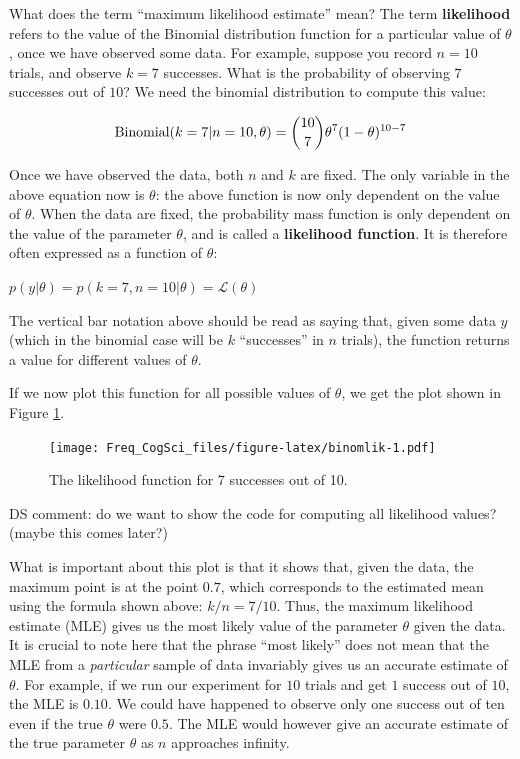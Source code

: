 \documentclass[12pt,]{krantz}
\makeatletter
\newenvironment{kframe}{%
\medskip{}
\setlength{\fboxsep}{.8em}
 \def\at@end@of@kframe{}%
 \ifinner\ifhmode%
  \def\at@end@of@kframe{\end{minipage}}%
  \begin{minipage}{\columnwidth}%
 \fi\fi%
 \def\FrameCommand##1{\hskip\@totalleftmargin \hskip-\fboxsep
 \colorbox{shadecolor}{##1}\hskip-\fboxsep
     \hskip-\linewidth \hskip-\@totalleftmargin \hskip\columnwidth}%
 \MakeFramed {\advance\hsize-\width
   \@totalleftmargin\z@ \linewidth\hsize
   \@setminipage}}%
 {\par\unskip\endMakeFramed%
 \at@end@of@kframe}
\newenvironment{rmdblock}[1]
  {
  \begin{itemize}
  \renewcommand{\labelitemi}{
    \raisebox{-.7\height}[0pt][0pt]{
      {\setkeys{Gin}{width=3em,keepaspectratio}\texttt{[image: images/\#1]}}
    }
  }
  \setlength{\fboxsep}{1em}
  \begin{kframe}
  \item
  }
  {
  \end{kframe}
  \end{itemize}
  }
\newenvironment{rmdnote}
  {\begin{rmdblock}{note}}
  {\end{rmdblock}}
\makeatother
\begin{document}
What does the term ``maximum likelihood estimate'' mean? The term \textbf{likelihood} refers to the value of the Binomial distribution function for a particular value of \(\theta\), once we have observed some data. For example, suppose you record \(n=10\) trials, and observe \(k=7\) successes. What is the probability of observing \(7\) successes out of \(10\)? We need the binomial distribution to compute this value:

\begin{equation}
\hbox{Binomial}(k=7|n=10,\theta) = 
\binom{10}{7} \theta^{7} (1-\theta)^{10-7}
\end{equation}

Once we have observed the data, both \(n\) and \(k\) are fixed. The only variable in the above equation now is \(\theta\): the above function is now only dependent on the value of \(\theta\). When the data are fixed, the probability mass function is only dependent on the value of the parameter \(\theta\), and is called a \textbf{likelihood function}. It is therefore often expressed as a function of \(\theta\):

\(p( y | \theta ) = p( k=7, n=10 | \theta) = \mathcal{L}(\theta)\)

The vertical bar notation above should be read as saying that, given some data \(y\) (which in the binomial case will be \(k\) ``successes'' in \(n\) trials), the function returns a value for different values of \(\theta\).

If we now plot this function for all possible values of \(\theta\), we get the plot shown in Figure \ref{fig:binomlik}.

\begin{figure}
\centering
\texttt{[image: Freq\_CogSci\_files/figure-latex/binomlik-1.pdf]}
\caption{\label{fig:binomlik}The likelihood function for 7 successes out of 10.}
\end{figure}

\begin{rmdnote}
DS comment: do we want to show the code for computing all likelihood values? (maybe this comes later?)
\end{rmdnote}

What is important about this plot is that it shows that, given the data, the maximum point is at the point \(0.7\), which corresponds to the estimated mean using the formula shown above: \(k/n = 7/10\). Thus, the maximum likelihood estimate (MLE) gives us the most likely value of the parameter \(\theta\) given the data. It is crucial to note here that the phrase ``most likely'' does not mean that the MLE from a \emph{particular} sample of data invariably gives us an accurate estimate of \(\theta\). For example, if we run our experiment for \(10\) trials and get \(1\) success out of \(10\), the MLE is \(0.10\). We could have happened to observe only one success out of ten even if the true \(\theta\) were \(0.5\). The MLE would however give an accurate estimate of the true parameter \(\theta\) as \(n\) approaches infinity.
\end{document}
